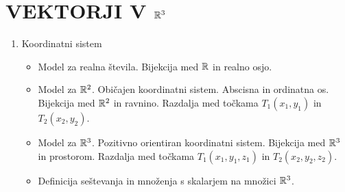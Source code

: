 \section{VEKTORJI V $\mathbb{R}^3$}

\begin{enumerate}
    \item Koordinatni sistem
    \begin{itemize}
        \item Model za realna števila. Bijekcija med $\mathbb{R}$ in realno osjo.
        \item Model za $\mathbb{R}^2$. Običajen koordinatni sistem. Abscisna in ordinatna os. Bijekcija med $\mathbb{R}^2$ in ravnino. Razdalja med točkama $T_1(x_1, y_1)$ in $T_2(x_2, y_2)$.
        \item Model za $\mathbb{R}^3$. Pozitivno orientiran koordinatni sistem. Bijekcija med $\mathbb{R}^3$ in prostorom. Razdalja med točkama $T_1(x_1, y_1, z_1)$ in $T_2(x_2, y_2, z_2)$.
        \item Definicija seštevanja in množenja s skalarjem na množici $\mathbb{R}^3$.
    \end{itemize}


\end{enumerate}
